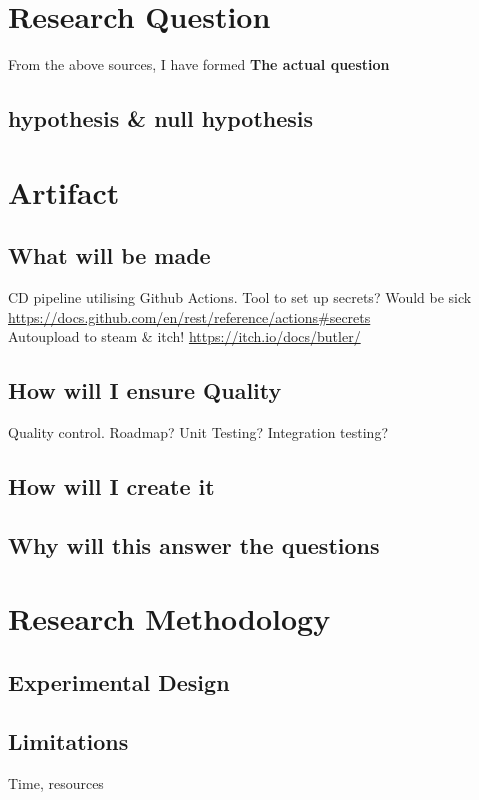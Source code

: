 \documentclass[lettersize,journal]{IEEEtran}
\begin{document}
\section{Research Question}
    From the above sources, I have formed \textbf{The actual question}
    \subsection{hypothesis \& null hypothesis}

\section{Artifact}
    \subsection{What will be made}
        CD pipeline utilising Github Actions. Tool to set up secrets? Would be sick \url{https://docs.github.com/en/rest/reference/actions#secrets} \\
        Autoupload to steam \& itch! \url{https://itch.io/docs/butler/}

    \subsection{How will I ensure Quality}
        Quality control. Roadmap? Unit Testing? Integration testing?

    \subsection{How will I create it}

    \subsection{Why will this answer the questions}

\section{Research Methodology}
    \subsection{Experimental Design}

    \subsection{Limitations}
        Time, resources
\end{document}
